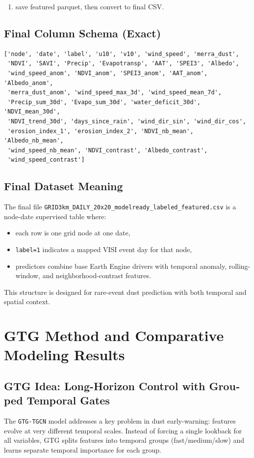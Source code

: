 \documentclass[12pt,a4paper]{article}
\begin{document}
\begin{latin}
\begin{enumerate}
(\texttt{NDVI\_nb\_mean}, \texttt{Albedo\_nb\_mean}, \texttt{wind\_speed\_nb\_mean}, \texttt{NDVI\_contrast}, 

\texttt{Albedo\_contrast}, \texttt{wind\_speed\_contrast}),
\item save featured parquet, then convert to final CSV.
\end{enumerate}

\subsection{Final Column Schema (Exact)}
\begin{lstlisting}[basicstyle=\ttfamily\scriptsize,breaklines=true]
['node', 'date', 'label', 'u10', 'v10', 'wind_speed', 'merra_dust',
 'NDVI', 'SAVI', 'Precip', 'Evapotransp', 'AAT', 'SPEI3', 'Albedo',
 'wind_speed_anom', 'NDVI_anom', 'SPEI3_anom', 'AAT_anom', 'Albedo_anom',
 'merra_dust_anom', 'wind_speed_max_3d', 'wind_speed_mean_7d',
 'Precip_sum_30d', 'Evapo_sum_30d', 'water_deficit_30d', 'NDVI_mean_30d',
 'NDVI_trend_30d', 'days_since_rain', 'wind_dir_sin', 'wind_dir_cos',
 'erosion_index_1', 'erosion_index_2', 'NDVI_nb_mean', 'Albedo_nb_mean',
 'wind_speed_nb_mean', 'NDVI_contrast', 'Albedo_contrast',
 'wind_speed_contrast']
\end{lstlisting}

\subsection{Final Dataset Meaning}
The final file \texttt{GRID3km\_DAILY\_20x20\_modelready\_labeled\_featured.csv} is a node-date supervised table where:
\begin{itemize}
\item each row is one grid node at one date,
\item \texttt{label=1} indicates a mapped VISI event day for that node,
\item predictors combine base Earth Engine drivers with temporal anomaly, rolling-window, and neighborhood-contrast features.
\end{itemize}
This structure is designed for rare-event dust prediction with both temporal and spatial context.

\section{GTG Method and Comparative Modeling Results}

\subsection{GTG Idea: Long-Horizon Control with Grouped Temporal Gates}
The \texttt{GTG-TGCN} model addresses a key problem in dust early-warning: features evolve at very different temporal scales.
Instead of forcing a single lookback for all variables, GTG splits features into temporal groups (fast/medium/slow) and learns separate temporal importance for each group.


\end{latin}
\end{document}
